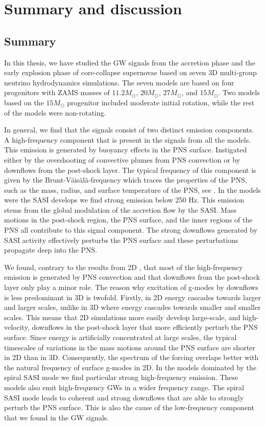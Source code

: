 \chapter{Summary and discussion}
\section{Summary}
In this thesis, we have studied the GW signals from the accretion phase and the early
explosion phase of core-collapse supernovae based on seven 3D
multi-group neutrino hydrodynamics simulations. The seven models are based on four progenitors
with ZAMS masses of $11.2 M_\odot$, $20 M_\odot$, $27 M_\odot$, and $15 M_\odot$.
Two models based on the $15 M_\odot$ progenitor included moderate initial rotation, while the
rest of the models were non-rotating.

In general, we find that the signals consist of two distinct emission components. A high-frequency component that is present in the signals from all the models. This emission is generated
by buoyancy effects in the PNS surface. Instigated either by the overshooting of convective plumes
from PNS convection or by downflows from the post-shock layer. The typical frequency of this component is
given by the Brunt-V\"{a}is\"{a}l\"{a}-frequency which traces the properties of the PNS, such as the mass, radius, 
and surface temperature of the PNS, see \cite{mueller_13}.
In the models were the SASI develops we find strong emission below 250 Hz. This emission stems from the
global modulation of the accretion flow by the SASI. 
Mass motions in the post-shock region, the PNS surface, and the inner regions
of the PNS all contribute to this signal component. The strong downflows generated by SASI activity effectively perturbs the PNS surface and these
perturbations propagate deep into the PNS.

We found, contrary to the results from 2D \citep{marek_08,murphy_09,mueller_13}, that most of the high-frequency emission is generated by PNS convection and that downflows from the post-shock layer only play a minor role. The reason why excitation of g-modes by downflows is less predominant in 3D is twofold. Firstly, in 2D energy cascades towards larger and larger scales, unlike
in 3D where energy cascades towards smaller and smaller scales. This means that 2D simulations more easily develop large-scale, and
high-velocity, downflows in the post-shock layer that more efficiently perturb the PNS surface. Since energy is artificially concentrated at large scales, the typical timescales of variations in the mass motions around the PNS surface are shorter in 2D than in 3D. Consequently, the spectrum of the forcing overlaps better with the natural frequency
of surface g-modes in 2D.
In the models dominated by the spiral SASI mode we find particular strong high-frequency emission. These models
also emit high-frequency GWs in a wider frequency range. The spiral SASI mode leads to coherent and strong downflows that are able to
strongly perturb the PNS surface. This is also the cause of the low-frequency component that we found in the GW signals.  

